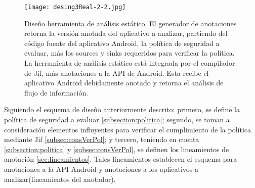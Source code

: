 \begin{figure}[t!]
	\begin{center} 
	\texttt{[image: desing3Real-2-2.jpg]} 
	\end{center}
	\caption{Diseño herramienta de análisis estático. 
	El generador de anotaciones retorna la versión anotada del aplicativo a
	analizar, partiendo del código fuente del aplicativo Android, la
	política de seguridad a evaluar, más los sources y sinks requeridos para
	verificar la política. La herramienta de análisis estático está integrada por
	el compilador de Jif, más anotaciones a la API de Android. Esta recibe el
	aplicativo Android debidamente anotado y retorna el análisis de flujo de
	información.}
	\label{fig:desingReal}
\end{figure}

% 
% 
Siguiendo el esquema de diseño anteriormente descrito: primero, se define la
política de seguridad a evaluar \ref{subsection:politica}; segundo, se toman a
consideración elementos influyentes para verificar el cumplimiento de la
política mediante Jif \ref{subsec:consVerPol}; y tercero, teniendo en cuenta
\ref{subsection:politica} y \ref{subsec:consVerPol}, se definen los lineamientos
de anotación \ref{sec:lineamientos}. Tales lineamientos establecen el esquema
para anotaciones a la API Android y anotaciones a los aplicativos a
analizar(lineamientos del anotador).

